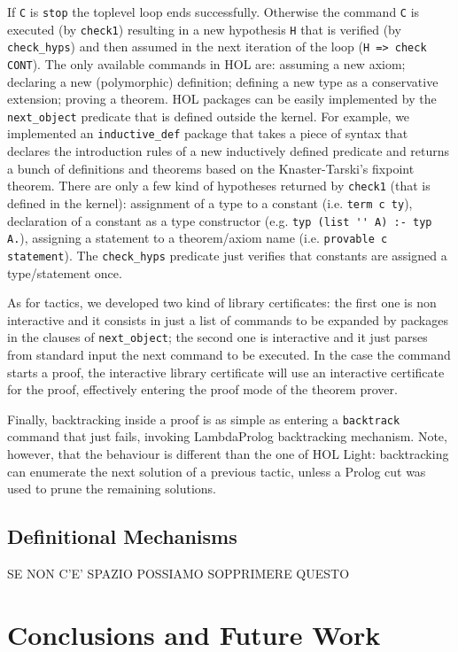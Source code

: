 \documentclass[preprint]{sigplanconf}
\begin{document}
If \verb+C+ is \verb+stop+ the toplevel loop ends successfully. Otherwise the command \verb+C+ is executed (by \verb+check1+) resulting in a new hypothesis \verb+H+ that is verified (by \verb+check_hyps+) and then assumed in the next iteration of the loop (\verb+H => check CONT+). The only available commands in HOL are: assuming a new axiom; declaring a new (polymorphic) definition; defining a new type as a conservative extension; proving a theorem. HOL packages can be easily implemented by the \verb+next_object+ predicate that is defined outside the kernel. For example, we implemented an \verb+inductive_def+ package that takes a piece of syntax that declares the introduction rules of a new inductively defined predicate and returns a bunch of definitions and theorems based on the Knaster-Tarski's fixpoint theorem. There are only a few kind of hypotheses returned by \verb+check1+ (that is defined in the kernel): assignment of a type to a constant (i.e. \verb+term c ty+), declaration of a constant as a type constructor (e.g. \verb+typ (list '' A) :- typ A.+), assigning a statement to a theorem/axiom name (i.e. \verb+provable c statement+). The \verb+check_hyps+ predicate just verifies that constants are assigned a type/statement once.

As for tactics, we developed two kind of library certificates: the first one is non interactive and it consists in just a list of commands to be expanded by packages in the clauses of \verb+next_object+; the second one is interactive and it just parses from standard input the next command to be executed. In the case the command starts a proof, the interactive library certificate will use an interactive certificate for the proof, effectively entering the proof mode of the theorem prover.

Finally, backtracking inside a proof is as simple as entering a \verb+backtrack+ command that just fails, invoking LambdaProlog backtracking mechanism. Note, however, that the behaviour is different than the one of HOL Light: backtracking can enumerate the next solution of a previous tactic, unless a Prolog cut was used to prune the remaining solutions.

\subsection{Definitional Mechanisms}

SE NON C'E' SPAZIO POSSIAMO SOPPRIMERE QUESTO

\section{Conclusions and Future Work}
\end{document}
